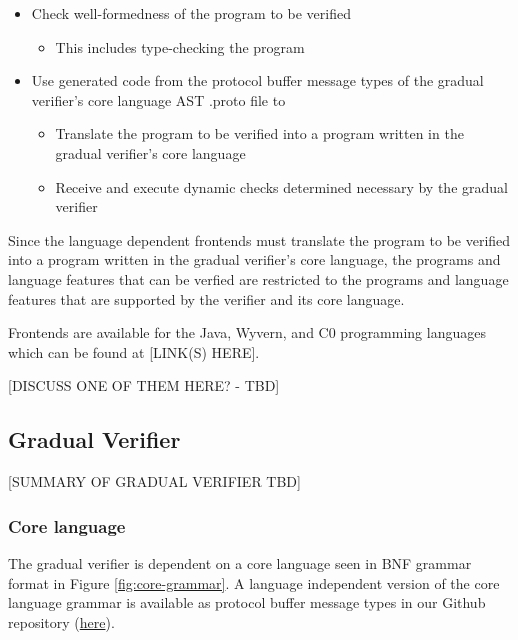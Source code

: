 \documentclass {article}
\begin{document}
\begin{itemize}
\item Check well-formedness of the program to be verified
	\begin{itemize}
	\item This includes type-checking the program
	\end{itemize}
\item Use generated code from the protocol buffer message types of the gradual verifier's core language AST .proto file to
	\begin{itemize}
	\item Translate the program to be verified into a program written in the gradual verifier's core language
	\item Receive and execute dynamic checks determined necessary by the gradual verifier
	\end{itemize}
\end{itemize}

Since the language dependent frontends must translate the program to be verified into a program written in the gradual verifier's core language, the programs and language features that can be verfied are restricted to the programs and language features that are supported by the verifier and its core language.

Frontends are available for the Java, Wyvern, and C0 programming languages which can be found at [LINK(S) HERE].

[DISCUSS ONE OF THEM HERE? - TBD]

\subsection{Gradual Verifier}
[SUMMARY OF GRADUAL VERIFIER TBD]

\subsubsection{Core language}
The gradual verifier is dependent on a core language seen in BNF grammar format in Figure \ref{fig:core-grammar}. A language independent version of the core language grammar is available as protocol buffer message types in our Github repository (\href{https://github.com/wyvernlang/grad-ver/blob/master/src/ast/ast.proto}{here}). 
\end{document}
